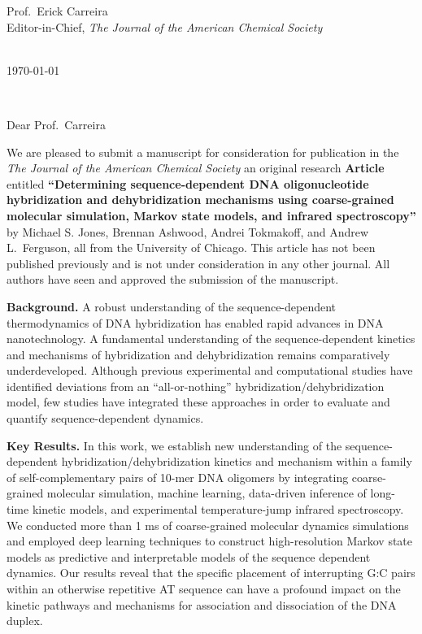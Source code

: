 \documentclass[11pt,a4paper]{letter} %
\makeatletter
\def\opening#1{\thispagestyle{empty}
{\centering\fromaddress \vspace{1.1in} \\ %
%
\hspace*{4.15 in}\today\hspace*{\fill}\par
} %
{\raggedright \toname \\ \toaddress \par} %
\vspace{0.05in} %
\noindent #1 %
}
\makeatother
\begin{document}

\begin{letter}
{
Prof.\ Erick Carreira \\
Editor-in-Chief, \textit{The Journal of the American Chemical Society}
}

\newcommand*{\noteb}[1]{\textcolor{blue}{[[#1]]}}		%

\opening{Dear Prof.\ Carreira}

We are pleased to submit a manuscript for consideration for publication in the \textit{The Journal of the American Chemical Society} an original research \textbf{Article} entitled \textbf{``Determining sequence-dependent DNA oligonucleotide hybridization and dehybridization mechanisms using coarse-grained molecular simulation, Markov state models, and infrared spectroscopy''} by Michael S. Jones, Brennan Ashwood, Andrei Tokmakoff, and Andrew L.\ Ferguson, all from the University of Chicago. This article has not been published previously and is not under consideration in any other journal. All authors have seen and approved the submission of the manuscript.

\textbf{Background.}  A robust understanding of the sequence-dependent thermodynamics of DNA hybridization has enabled rapid advances in DNA nanotechnology. A fundamental understanding of the sequence-dependent kinetics and mechanisms of hybridization and dehybridization remains comparatively underdeveloped. Although previous experimental and computational studies have identified deviations from an ``all-or-nothing'' hybridization/dehybridization model, few studies have integrated these approaches in order to evaluate and quantify sequence-dependent dynamics.

\textbf{Key Results.}  In this work, we establish new understanding of the sequence-dependent hybridization/dehybridization kinetics and mechanism within a family of self-complementary pairs of 10-mer DNA oligomers by integrating coarse-grained molecular simulation, machine learning, data-driven inference of long-time kinetic models, and experimental temperature-jump infrared spectroscopy. We conducted more than 1 ms of coarse-grained molecular dynamics simulations and employed deep learning techniques to construct high-resolution Markov state models as predictive and interpretable models of the sequence dependent dynamics. Our results reveal that the specific placement of interrupting G:C pairs within an otherwise repetitive AT sequence can have a profound impact on the kinetic pathways and mechanisms for association and dissociation of the DNA duplex.


\end{letter}
\end{document}

